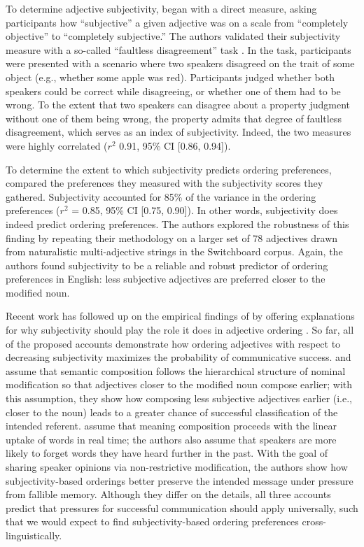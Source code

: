 \documentclass[12pt,letterpaper]{article}
\begin{document}
To determine adjective subjectivity, \citeauthor{scontrasetal2017adjectives} began with a direct measure, asking participants how ``subjective'' a given adjective was on a scale from ``completely objective'' to ``completely subjective.'' The authors validated their subjectivity measure with a so-called ``faultless disagreement'' task \citep{Kolbel2004,Barker2013,Kennedy2013,MacFarlane2014}. In the task, participants were presented with a scenario where two speakers disagreed on the trait of some object (e.g., whether some apple was red). Participants judged whether both speakers could be correct while disagreeing, or whether one of them had to be wrong. To the extent that two speakers can disagree about a property judgment without one of them being wrong, the property admits that degree of faultless disagreement, which serves as an index of subjectivity. Indeed, the two measures were  highly correlated ($r^2$ 0.91, 95\% CI [0.86, 0.94]).

To determine the extent to which subjectivity predicts ordering preferences, \citeauthor{scontrasetal2017adjectives} compared the preferences they measured with the subjectivity scores they gathered. Subjectivity accounted for 85\% of the variance in the ordering preferences ($r^2$ = 0.85, 95\% CI [0.75, 0.90]). In other words, subjectivity does indeed predict ordering preferences. The authors explored the robustness of this finding by repeating their methodology on a larger set of 78 adjectives drawn from naturalistic multi-adjective strings in the Switchboard corpus. Again, the authors found subjectivity to be a reliable and robust predictor of ordering preferences in English: less subjective adjectives are preferred closer to the modified noun.

Recent work has followed up on the empirical findings of \cite{scontrasetal2017adjectives} by offering explanations for why subjectivity should play the role it does in adjective ordering \citep{hahnetal2018,simonic2018,scontrasetalSPadjectives}. So far, all of the proposed accounts demonstrate how ordering adjectives with respect to decreasing subjectivity maximizes the probability of communicative success. \cite{simonic2018} and \cite{scontrasetalSPadjectives} assume that semantic composition follows the hierarchical structure of nominal modification so that adjectives closer to the modified noun compose earlier; with this assumption, they show how composing less subjective adjectives earlier (i.e., closer to the noun) leads to a greater chance of successful classification of the intended referent. \cite{hahnetal2018} assume that meaning composition proceeds with the linear uptake of words in real time; the authors also assume that speakers are more likely to forget words they have heard further in the past. With the goal of sharing speaker opinions via non-restrictive modification, the authors show how subjectivity-based orderings better preserve the intended message under pressure from fallible memory. Although they differ on the details, all three accounts predict that pressures for successful communication should apply universally, such that we would expect to find subjectivity-based ordering preferences cross-linguistically. 
\end{document}
